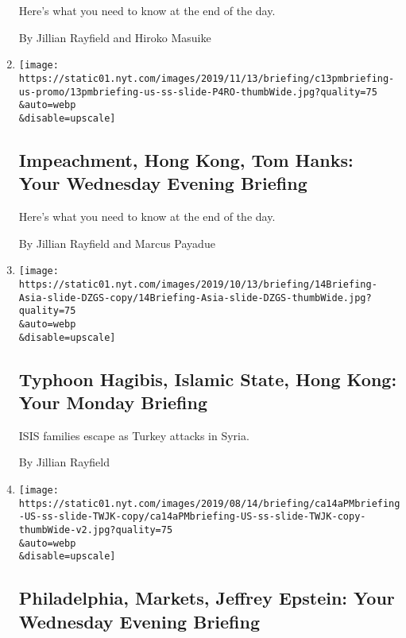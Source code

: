 \begin{enumerate}
  Here's what you need to know at the end of the day.

  By Jillian Rayfield and Hiroko Masuike
\item
  \href{/2019/11/13/briefing/impeachment-hong-kong-tom-hanks-.html}{}

  \texttt{[image: https://static01.nyt.com/images/2019/11/13/briefing/c13pmbriefing-us-promo/13pmbriefing-us-ss-slide-P4RO-thumbWide.jpg?quality=75\\\&auto=webp\\\&disable=upscale]}

  \hypertarget{impeachment-hong-kong-tom-hanks-your-wednesday-evening-briefing}{%
  \subsection{Impeachment, Hong Kong, Tom Hanks: Your Wednesday Evening
  Briefing}\label{impeachment-hong-kong-tom-hanks-your-wednesday-evening-briefing}}

  Here's what you need to know at the end of the day.

  By Jillian Rayfield and Marcus Payadue
\item
  \href{/2019/10/13/briefing/typhoon-hagibis-islamic-state-hong-kong.html}{}

  \texttt{[image: https://static01.nyt.com/images/2019/10/13/briefing/14Briefing-Asia-slide-DZGS-copy/14Briefing-Asia-slide-DZGS-thumbWide.jpg?quality=75\\\&auto=webp\\\&disable=upscale]}

  \hypertarget{typhoon-hagibis-islamic-state-hong-kong-your-monday-briefing}{%
  \subsection{Typhoon Hagibis, Islamic State, Hong Kong: Your Monday
  Briefing}\label{typhoon-hagibis-islamic-state-hong-kong-your-monday-briefing}}

  ISIS families escape as Turkey attacks in Syria.~

  By Jillian Rayfield
\item
  \href{/2019/08/14/briefing/philadelphia-markets-jeffrey-epstein.html}{}

  \texttt{[image: https://static01.nyt.com/images/2019/08/14/briefing/ca14aPMbriefing-US-ss-slide-TWJK-copy/ca14aPMbriefing-US-ss-slide-TWJK-copy-thumbWide-v2.jpg?quality=75\\\&auto=webp\\\&disable=upscale]}

  \hypertarget{philadelphia-markets-jeffrey-epstein-your-wednesday-evening-briefing}{%
  \subsection{Philadelphia, Markets, Jeffrey Epstein: Your Wednesday
  Evening
  Briefing}\label{philadelphia-markets-jeffrey-epstein-your-wednesday-evening-briefing}}


\end{enumerate}
